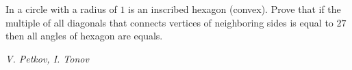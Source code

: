 In a circle with a radius of $1$ is an inscribed hexagon (convex). Prove that if the multiple of all diagonals that connects vertices of neighboring sides is equal to $27$ then all angles of hexagon are equals.

\textit{V. Petkov, I. Tonov}